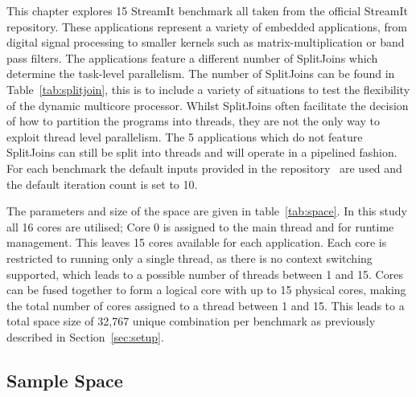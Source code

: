 This chapter explores 15 StreamIt benchmark all taken from the official StreamIt repository.
These applications represent a variety of embedded applications, from digital signal processing to smaller kernels such as matrix-multiplication or band pass filters.
The applications feature a different number of SplitJoins which determine the task-level parallelism.
The number of SplitJoins can be found in Table~\ref{tab:splitjoin}, this is to include a variety of situations to test the flexibility of the dynamic multicore processor.
Whilst SplitJoins often facilitate the decision of how to partition the programs into threads, they are not the only way to exploit thread level parallelism.
The 5 applications which do not feature SplitJoins can still be split into threads and will operate in a pipelined fashion.
For each benchmark the default inputs provided in the repository~\cite{streamitrepo} are used and the default iteration count is set to 10. 

The parameters and size of the space are given in table~\ref{tab:space}.
In this study all 16 cores are utilised; Core 0 is assigned to the main thread and for runtime management. 
This leaves 15 cores available for each application.
Each core is restricted to running only a single thread, as there is no context switching supported, which leads to a possible number of threads between 1 and 15.
Cores can be fused together to form a logical core with up to 15 physical cores, making the total number of cores assigned to a thread between 1 and 15.
This leads to a total space size of 32,767 unique combination per benchmark as previously described in Section~\ref{sec:setup}.

\subsection{Sample Space}

